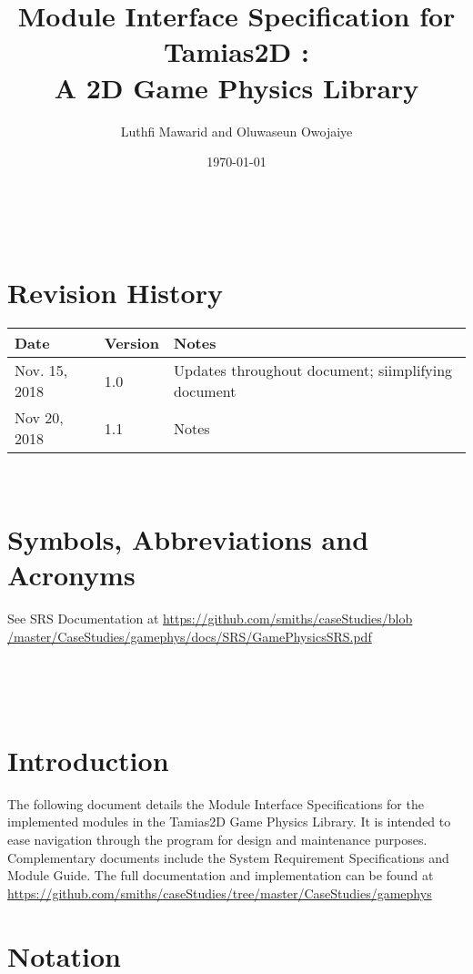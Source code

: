 \documentclass[12pt]{article}
\newcommand{\progname}{Tamias2D }
\begin{document}
\title{Module Interface Specification for \progname:\\ A 2D Game Physics Library} \author{Luthfi Mawarid and Oluwaseun Owojaiye}
\date{\today}
\maketitle

~\newpage
{}

\section{Revision History}

\begin{tabularx}{\textwidth}{p{3cm}p{2cm}X}
	\toprule {\bf Date} & {\bf Version} & {\bf Notes}\\
	\midrule
	Nov. 15, 2018 & 1.0 & Updates throughout document; siimplifying document\\
	Nov 20, 2018 & 1.1 & Notes\\
	\bottomrule
\end{tabularx}

~\newpage

\section{Symbols, Abbreviations and Acronyms}

See SRS Documentation at \url{https://github.com/smiths/caseStudies/blob
	/master/CaseStudies/gamephys/docs/SRS/GamePhysicsSRS.pdf}

~\newpage
\tableofcontents

~\newpage
{}

\section{Introduction} \label{SecIntro}

The following document details the Module Interface
Specifications for the implemented modules in the \progname Game Physics Library.  It is intended to ease navigation through the program for design and
maintenance purposes.  Complementary documents include the System
Requirement Specifications and Module Guide. The full documentation and implementation can be found at \url{https://github.com/smiths/caseStudies/tree/master/CaseStudies/gamephys}

\section{Notation} \label{SecNotation}
\end{document}
